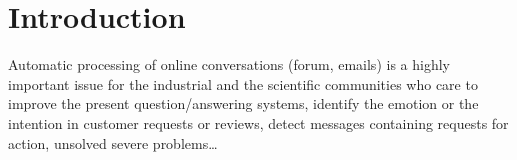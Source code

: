 
\section{Introduction}
\label{sec:intro}

Automatic processing of online conversations (forum, emails) 
is a highly important issue for the industrial and the scientific communities who care to improve the present question/answering systems, identify the emotion or the intention in customer requests or reviews, detect messages containing requests for action, unsolved severe problems\ldots










